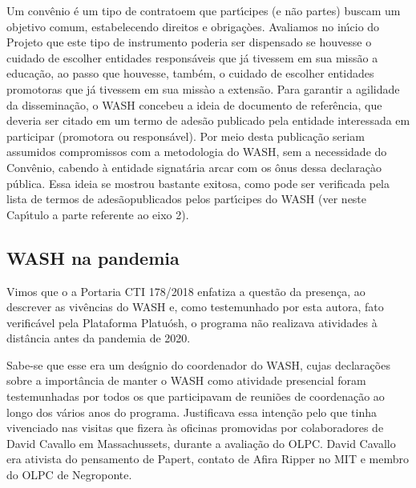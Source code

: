 \documentclass[
12pt,		%
openright,	%
twoside,  %
a4paper,			%
chapter=TITLE,		%
english,			%
french,				%
spanish,			%
brazil				%
]{USPSC-classe/USPSC}
\begin{document}
Um conv\^enio \'e um tipo de \textquotedbl contrato\textquotedbl  em que part\'{\i}cipes (e n\~ao partes) buscam um objetivo comum, estabelecendo direitos e obriga\c{c}òes. Avaliamos no in\'{\i}cio do Projeto que este tipo de instrumento poderia ser dispensado se houvesse o cuidado de escolher entidades respons\'aveis que j\'a tivessem em sua miss\~ao a educa\c{c}\~ao, ao passo que houvesse, tamb\'em, o cuidado de escolher entidades promotoras que j\'a tivessem em sua miss\`ao a extens\~ao. Para garantir a agilidade da dissemina\c{c}\~ao, o WASH concebeu a ideia de \textquotedbl documento de refer\^encia\textquotedbl , que deveria ser citado em um termo de ades\~ao publicado pela entidade interessada em participar (promotora ou respons\'avel). Por meio desta publica\c{c}\~ao seriam assumidos compromissos com a metodologia do WASH, sem a necessidade do Conv\^enio, cabendo \`a entidade signat\'aria arcar com os \^onus dessa declara\c{c}\`ao p\'ublica. Essa ideia se mostrou bastante exitosa, como pode ser verificada pela lista de \textquotedbl termos de ades\~ao\textquotedbl  publicados pelos part\'{\i}cipes do WASH (ver neste Cap\'{\i}tulo a parte referente ao eixo 2).








\subsection[WASH na pandemia]{WASH na pandemia}\label{WASH na pandemia}
Vimos que o a Portaria CTI 178/2018 enfatiza a quest\~ao da \textquotedbl presen\c{c}a\textquotedbl , ao descrever as viv\^encias do WASH e, como testemunhado por esta autora, fato verific\'avel pela Plataforma Platu\'osh, o programa n\~ao realizava atividades \`a dist\^ancia antes da pandemia de 2020.








Sabe-se que esse era um des\'{\i}gnio do coordenador do WASH, cujas declara\c{c}\~oes sobre a import\^ancia de manter o WASH como atividade presencial foram testemunhadas por todos os que participavam de reuni\~oes de coordena\c{c}\~ao ao longo dos v\'arios anos do programa. Justificava essa inten\c{c}\~ao pelo que tinha vivenciado nas visitas que fizera \`as oficinas promovidas por colaboradores de David Cavallo em Massachussets, durante a avalia\c{c}\~ao do OLPC. David Cavallo era ativista do pensamento de Papert, contato de Afira Ripper no MIT e membro do OLPC de Negroponte.
\end{document}
